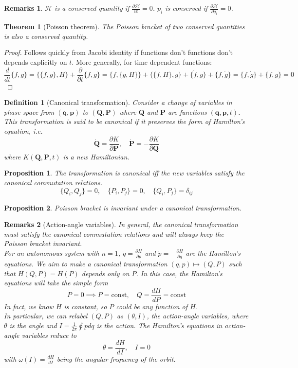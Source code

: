 \documentclass[a4paper]{article}
\newtheorem{remarks}{Remarks}[section]
\theoremstyle{new}
\newtheorem{defi}{Definition}[section]
\newtheorem{thm}{Theorem}[section]
\newtheorem{prop}{Proposition}[section]
\begin{document}
\begin{remarks}
$\mathcal{H}$ is a conserved quantity if $\frac{\partial\mathcal{H}}{\partial t}=0$. $p_i$ is conserved if $\frac{\partial\mathcal{H}}{\partial q_i}=0$.
\end{remarks}
\begin{thm}[Poisson theorem]
The Poisson bracket of two conserved quantities is also a conserved quantity.
\end{thm}
\begin{proof}
Follows quickly from Jacobi identity if functions don’t functions don’t depends explicitly on $t$. More generally, for time dependent functions:
$$\frac{d}{dt}\{f, g\} =\{\{f, g\}, H\} +\frac{\partial}{\partial t}\{f, g\}=\{f, \{g, H\}\} + \{\{f, H\}, g\} + \{\dot{f},g\}+\{f, \dot{g}\}=\{f,\dot{g}\}+\{\dot{f},g\}=0$$
\end{proof}
\begin{defi}[Canonical transformation]
Consider a change of variables in phase space from $(\mathbf{q},\mathbf{p})$ to $(\mathbf{Q},\mathbf{P})$ where $\mathbf{Q}$ and $\mathbf{P}$ are functions $(\mathbf{q},\mathbf{p}, t)$. This transformation is said to be canonical if it preserves the form of Hamilton’s equation, i.e.
$$\mathbf{\dot{Q}}=\frac{\partial K}{\partial\mathbf{P}},\quad\mathbf{\dot{P}}=-\frac{\partial K}{\partial\mathbf{Q}}$$
where $K(\mathbf{Q},\mathbf{P},t)$ is a new Hamiltonian.
\end{defi}
\begin{prop}
 The transformation is canonical iff the new variables satisfy the canonical commutation relations.
 $$\{Q_i,Q_j\}=0,\quad\{P_i,P_j\}=0,\quad\{Q_i,P_j\}=\delta_{ij}$$
\end{prop}
\begin{prop}
Poisson bracket is invariant under a canonical transformation.
\end{prop}
\begin{remarks}[Action-angle variables]
In general, the canonical transformation must satisfy the canonical commutation relations and will always keep the Poisson bracket invariant.\\[5pt]
For an autonomous system with $n=1$, $\dot{q}=\frac{\partial H}{\partial p}$ and $\dot{p}=-\frac{\partial H}{\partial q}$ are the Hamilton's equations. We aim to make a canonical transformation $(q,p)\mapsto(Q,P)$ such that $H(Q,P)=H(P)$ depends only on $P$. In this case, the Hamilton's equations will take the simple form
$$\dot{P}=0\implies P=\text{const},\quad\dot{Q}=\frac{dH}{dP}=\text{const}$$
In fact, we know $H$ is constant, so $P$ could be any function of $H$.\\[5pt]
In particular, we can relabel $(Q,P)$ as $(\theta,I)$, the action-angle variables, where $\theta$ is the angle and $I=\frac{1}{2\pi}\oint pdq$ is the action. The Hamilton's equations in action-angle variables reduce to 
$$\dot{\theta}=\frac{dH}{dI},\quad\dot{I}=0$$
with $\omega(I)=\frac{dH}{dI}$ being the angular frequency of the orbit.
\end{remarks}
\end{document}
